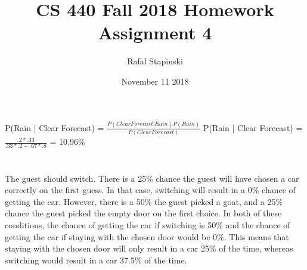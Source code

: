 \documentclass[a4paper]{article}
\title{CS 440 Fall 2018 Homework Assignment 4}
\author{Rafal Stapinski }
\date{November 11 2018}
\begin{document}
\maketitle

\section{}

P(Rain | Clear Forecast) = $\frac{P(Clear Forecast | Rain) P(Rain)}{P(Clear Forecast)}$ \newline
P(Rain | Clear Forecast) = $\frac{.2 * .33}{.33*.2 + .67*.8}$ = 10.96\%

\section{}
The guest should switch. There is a 25\% chance the guest will have chosen a car correctly on the first guess. In that case, switching will result in a 0\% chance of getting the car. However, there is a 50\% the guest picked a goat, and a 25\% chance the guest picked the empty door on the first choice. In both of these conditions, the chance of getting the car if switching is 50\% and the chance of getting the car if staying with the chosen door would be 0\%. This means that staying with the chosen door will only result in a car 25\% of the time, whereas switching would result in a car 37.5\% of the time. 
\end{document}
